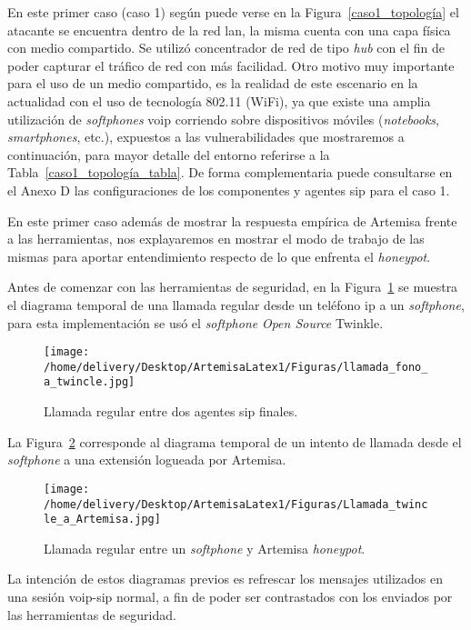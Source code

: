 \documentclass[a4paper,12pt]{report}
\begin{document}
\newpage

En este primer caso (caso 1) según puede verse en la Figura~\ref{caso1_topología} 
el atacante se encuentra dentro de la red \ac{lan}, la 
misma cuenta con una capa física con medio compartido. Se utilizó concentrador
de red de tipo \emph{hub} con el fin de poder capturar el tráfico de red con más
facilidad. Otro motivo muy importante para el uso de un medio compartido, es la
realidad de este escenario en la actualidad con el uso de tecnología 802.11
(WiFi), ya que existe una amplia utilización de \emph{softphones} \ac{voip} corriendo sobre
dispositivos móviles (\emph{notebooks}, \emph{smartphones}, etc.), expuestos a las
vulnerabilidades que mostraremos a continuación, para mayor detalle del entorno referirse 
a la Tabla~\ref{caso1_topología_tabla}. De forma complementaria puede consultarse en el Anexo D
las configuraciones de los componentes y agentes \ac{sip} para el caso 1.

En este primer caso además de mostrar la respuesta empírica de Artemisa frente a
 las he\-rra\-mien\-tas, nos explayaremos en mostrar el modo de trabajo de las mismas
para aportar entendimiento respecto de lo que enfrenta el \emph{honeypot}.

Antes de comenzar con las herramientas de seguridad, en la
Figura~\ref{call_fono_to_twincle} 
se muestra el diagrama temporal de una llamada regular desde un teléfono \ac{ip} a un
\emph{\mbox{softphone}}, para esta implementación se usó el \emph{softphone} \emph{Open Source} Twinkle.

\begin{figure}[h!] 
\centering
\texttt{[image: /home/delivery/Desktop/ArtemisaLatex1/Figuras/llamada\_fono\_a\_twincle.jpg]}
\caption{Llamada regular entre dos agentes \ac{sip} finales.}
\label{call_fono_to_twincle}
\end{figure}

La Figura~\ref{call_twincle_to_Artemisa} corresponde al diagrama temporal de un 
intento de llamada desde el \emph{softphone} a una extensión logueada por Artemisa. 

\begin{figure}[h!] 
\centering
\texttt{[image: /home/delivery/Desktop/ArtemisaLatex1/Figuras/Llamada\_twincle\_a\_Artemisa.jpg]}
\caption{Llamada regular entre un \emph{softphone} y Artemisa \emph{honeypot}.}
\label{call_twincle_to_Artemisa}
\end{figure}

La intención de estos diagramas previos es refrescar los mensajes utilizados en
 una sesión \ac{voip}-\ac{sip} normal, a fin de poder ser contrastados con los enviados
por las herramientas de seguridad.
\newpage
\end{document}
